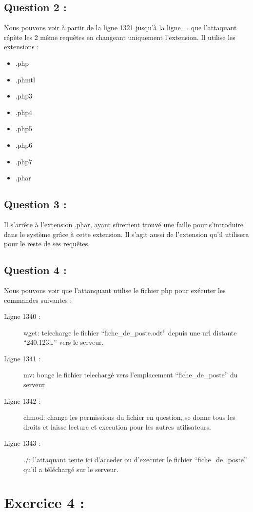 \documentclass{article}
\begin{document}
    \subsection{Question 2 :}
        Nous pouvons voir à partir de la ligne 1321 jusqu'à la ligne ... que l'attaquant répète les 2 même requêtes en changeant uniquement l'extension.
        Il utilise les extensions :
        \begin{itemize}
            \item .php
            \item .phmtl
            \item .php3
            \item .php4
            \item .php5
            \item .php6
            \item .php7
            \item .phar
        \end{itemize}
    \subsection{Question 3 :}
        Il s'arrête à l'extension .phar, ayant sûrement trouvé une faille pour s'introduire dans le système grâce à cette extension.
        Il s'agit aussi de l'extension qu'il utilisera pour le reste de ses requêtes.
    \subsection{Question 4 :}
        Nous pouvons voir que l'attanquant utilise le fichier php pour exécuter les commandes suivantes :
        \begin{description}
            \item[Ligne 1340 :] wget: telecharge le fichier “fiche\_de\_poste.odt” depuis une url distante “240.123…” vers le serveur.
            \item[Ligne 1341 :] mv: bouge le fichier telechargé vers l’emplacement “fiche_de_poste” du serveur
            \item[Ligne 1342 :] chmod; change les permissions du fichier en question, se donne tous les droits et laisse lecture et execution pour les autres utilisateurs.
            \item[Ligne 1343 :] ./: l’attaquant tente ici d’acceder ou d’executer le fichier “fiche_de_poste” qu’il a téléchargé sur le serveur.
        \end{description}
\section{Exercice 4 :}
\end{document}
